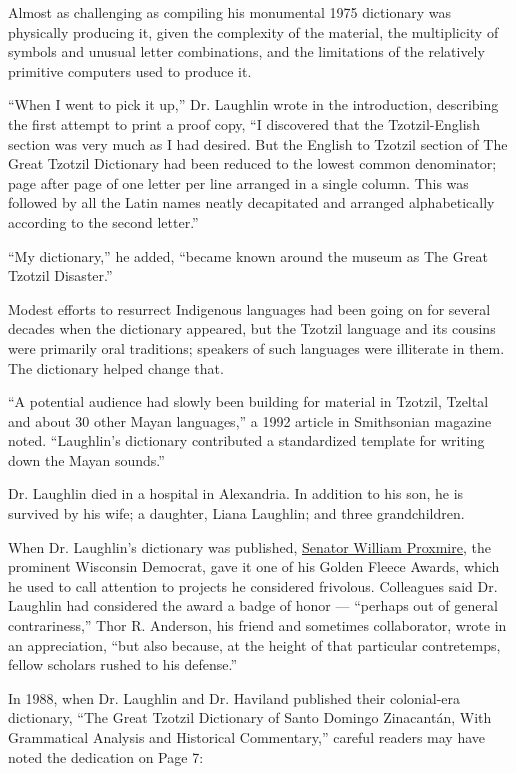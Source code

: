 Almost as challenging as compiling his monumental 1975 dictionary was
physically producing it, given the complexity of the material, the
multiplicity of symbols and unusual letter combinations, and the
limitations of the relatively primitive computers used to produce it.

``When I went to pick it up,'' Dr. Laughlin wrote in the introduction,
describing the first attempt to print a proof copy, ``I discovered that
the Tzotzil-English section was very much as I had desired. But the
English to Tzotzil section of The Great Tzotzil Dictionary had been
reduced to the lowest common denominator; page after page of one letter
per line arranged in a single column. This was followed by all the Latin
names neatly decapitated and arranged alphabetically according to the
second letter.''

``My dictionary,'' he added, ``became known around the museum as The
Great Tzotzil Disaster.''

Modest efforts to resurrect Indigenous languages had been going on for
several decades when the dictionary appeared, but the Tzotzil language
and its cousins were primarily oral traditions; speakers of such
languages were illiterate in them. The dictionary helped change that.

``A potential audience had slowly been building for material in Tzotzil,
Tzeltal and about 30 other Mayan languages,'' a 1992 article in
Smithsonian magazine noted. ``Laughlin's dictionary contributed a
standardized template for writing down the Mayan sounds.''

Dr. Laughlin died in a hospital in Alexandria. In addition to his son,
he is survived by his wife; a daughter, Liana Laughlin; and three
grandchildren.

When Dr. Laughlin's dictionary was published,
\href{https://www.nytimes3xbfgragh.onion/2005/12/16/us/william-proxmire-maverick-democratic-senator-from-wisconsin-is-dead-at.html?searchResultPosition=1}{Senator
William Proxmire}, the prominent Wisconsin Democrat, gave it one of his
Golden Fleece Awards, which he used to call attention to projects he
considered frivolous. Colleagues said Dr. Laughlin had considered the
award a badge of honor --- ``perhaps out of general contrariness,'' Thor
R. Anderson, his friend and sometimes collaborator, wrote in an
appreciation, ``but also because, at the height of that particular
contretemps, fellow scholars rushed to his defense.''

In 1988, when Dr. Laughlin and Dr. Haviland published their colonial-era
dictionary, ``The Great Tzotzil Dictionary of Santo Domingo Zinacantán,
With Grammatical Analysis and Historical Commentary,'' careful readers
may have noted the dedication on Page 7:

